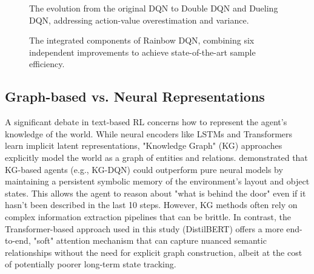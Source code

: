 \documentclass[11pt,a4paper]{article}
\begin{document}
\begin{figure}[H]
\centering
{}
\caption{The evolution from the original DQN to Double DQN and Dueling DQN, addressing action-value overestimation and variance.}
\end{figure}

\begin{figure}[H]
\centering
{}
\caption{The integrated components of Rainbow DQN, combining six independent improvements to achieve state-of-the-art sample efficiency.}
\end{figure}


\subsection{Graph-based vs. Neural Representations}
A significant debate in text-based RL concerns how to represent the agent's knowledge of the world. While neural encoders like LSTMs and Transformers learn implicit latent representations, "Knowledge Graph" (KG) approaches explicitly model the world as a graph of entities and relations. \citet{ammanabrolu2019playing} demonstrated that KG-based agents (e.g., KG-DQN) could outperform pure neural models by maintaining a persistent symbolic memory of the environment's layout and object states. This allows the agent to reason about "what is behind the door" even if it hasn't been described in the last 10 steps. However, KG methods often rely on complex information extraction pipelines that can be brittle. In contrast, the Transformer-based approach used in this study (DistilBERT) offers a more end-to-end, "soft" attention mechanism that can capture nuanced semantic relationships without the need for explicit graph construction, albeit at the cost of potentially poorer long-term state tracking.
\end{document}
